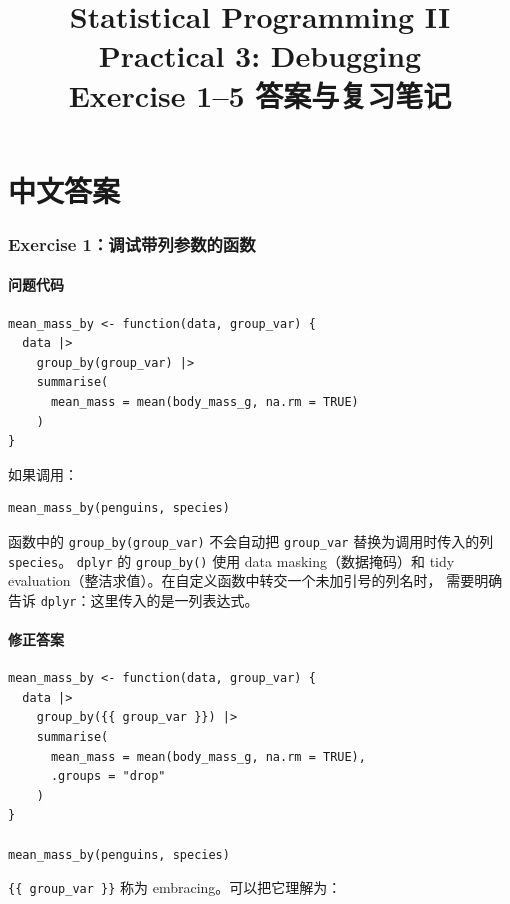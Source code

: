 \documentclass[11pt,a4paper]{ctexart}
\title{\textbf{Statistical Programming II}\\
Practical 3: Debugging\\
\large Exercise 1--5 答案与复习笔记}
\author{}
\date{}
\begin{document}
\maketitle
\tableofcontents
\newpage

\part{中文答案}

\section{Exercise 1：调试带列参数的函数}

\subsection{问题代码}

\begin{lstlisting}[style=rcode]
mean_mass_by <- function(data, group_var) {
  data |>
    group_by(group_var) |>
    summarise(
      mean_mass = mean(body_mass_g, na.rm = TRUE)
    )
}
\end{lstlisting}

如果调用：

\begin{lstlisting}[style=rcode]
mean_mass_by(penguins, species)
\end{lstlisting}

函数中的 \lstinline|group_by(group_var)| 不会自动把
\lstinline|group_var| 替换为调用时传入的列 \lstinline|species|。
\texttt{dplyr} 的 \lstinline|group_by()| 使用 data masking（数据掩码）和
tidy evaluation（整洁求值）。在自定义函数中转交一个未加引号的列名时，
需要明确告诉 \texttt{dplyr}：这里传入的是一列表达式。

\subsection{修正答案}

\begin{lstlisting}[style=rcode]
mean_mass_by <- function(data, group_var) {
  data |>
    group_by({{ group_var }}) |>
    summarise(
      mean_mass = mean(body_mass_g, na.rm = TRUE),
      .groups = "drop"
    )
}

mean_mass_by(penguins, species)
\end{lstlisting}

\lstinline|{{ group_var }}| 称为 embracing。可以把它理解为：
\end{document}
